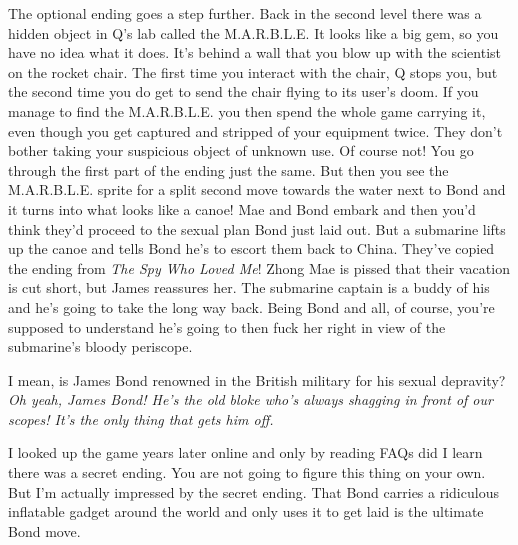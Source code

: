 \documentclass{book}
\let\oldcenter\center
\let\oldendcenter\endcenter
\renewenvironment{center}{\setlength\topsep{0pt}\oldcenter}{\oldendcenter}
\begin{document}
The optional ending goes a step further. Back in the second level there was a hidden object in Q’s lab called the M.A.R.B.L.E. It looks like a big gem, so you have no idea what it does. It’s behind a wall that you blow up with the scientist on the rocket chair. The first time you interact with the chair, Q stops you, but the second time you do get to send the chair flying to its user’s doom. If you manage to find the M.A.R.B.L.E. you then spend the whole game carrying it, even though you get captured and stripped of your equipment twice. They don’t bother taking your suspicious object of unknown use. Of course not! You go through the first part of the ending just the same. But then you see the M.A.R.B.L.E. sprite for a split second move towards the water next to Bond and it turns into what looks like a canoe! Mae and Bond embark and then you’d think they’d proceed to the sexual plan Bond just laid out. But a submarine lifts up the canoe and tells Bond he’s to escort them back to China. They’ve copied the ending from \emph{The Spy Who Loved Me}! Zhong Mae is pissed that their vacation is cut short, but James reassures her. The submarine captain is a buddy of his and he’s going to take the long way back. Being Bond and all, of course, you’re supposed to understand he’s going to then fuck her right in view of the submarine’s bloody periscope.

\begin{center}
\vspace{8pt}
\quad\vspace{4pt}
\quad\vspace{4pt}
\quad\vspace{4pt}
\quad\vspace{4pt}
\end{center}

I mean, is James Bond renowned in the British military for his sexual depravity? \emph{Oh yeah, James Bond! He’s the old bloke who’s always shagging in front of our scopes! It’s the only thing that gets him off.}

I looked up the game years later online and only by reading FAQs did I learn there was a secret ending. You are not going to figure this thing on your own. But I’m actually impressed by the secret ending. That Bond carries a ridiculous inflatable gadget around the world and only uses it to get laid is the ultimate Bond move.
\end{document}
